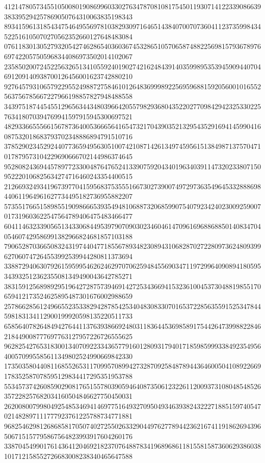 \begin{DoxyCode}
      412147805734551050080190869960330276347870810817545011930714122339086639383395294257869050764310063835198343
      893415961318543475464955697810382930971646514384070070736041123735998434522516105070270562352660127648483084
      076118301305279320542746286540360367453286510570658748822569815793678976697422057505968344086973502014102067
      235850200724522563265134105592401902742162484391403599895353945909440704691209140938700126456001623742880210
      927645793106579229552498872758461012648369998922569596881592056001016552563756785667227966198857827948488558
      343975187445455129656344348039664205579829368043522027709842942325330225763418070394769941597915945300697521
      482933665556615678736400536665641654732170439035213295435291694145990416087532018683793702348886894791510716
      378529023452924407736594956305100742108714261349745956151384987137570471017879573104229690666702144986374645
      952808243694457897723300487647652413390759204340196340391147320233807150952220106825634274716460243354400515
      212669324934196739770415956837535551667302739007497297363549645332888698440611964961627734495182736955882207
      573551766515898551909866653935494810688732068599075407923424023009259007017319603622547564789406475483466477
      604114632339056513433068449539790709030234604614709616968868850140834704054607429586991382966824681857103188
      790652870366508324319744047718556789348230894310682870272280973624809399627060747264553992539944280811373694
      338872940630792615959954626246297070625948455690347119729964090894180595343932512362355081349490043642785271
      383159125689892951964272875739469142725343669415323610045373048819855170659412173524625895487301676002988659
      257866285612496655235338294287854253404830833070165372285635591525347844598183134112900199920598135220511733
      658564078264849427644113763938669248031183644536985891754426473998822846218449008777697763127957226726555625
      962825427653183001340709223343657791601280931794017185985999338492354956400570995585611349802524990669842330
      173503580440811685526531170995708994273287092584878944364600504108922669178352587078595129834417295351953788
      553457374260859029081765155780390594640873506123226112009373108048548526357228257682034160504846627750450031
      262008007998049254853469414697751649327095049346393824322271885159740547021482897111777923761225788734771881
      968254629812686858170507402725502633290449762778944236216741191862694396506715157795867564823993917604260176
      338704549901761436412046921823707648878341968968611815581587360629386038101712158552726683008238340465647588

\end{DoxyCode}
